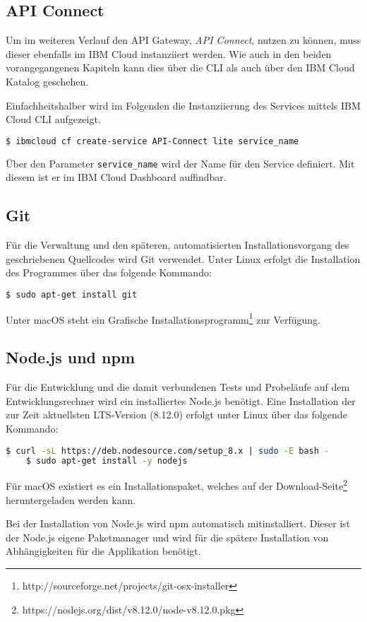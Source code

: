 \subsection{API Connect}
\label{subsec:apiconnect}
Um im weiteren Verlauf den API Gateway, \textit{API Connect}, nutzen zu können, muss dieser ebenfalls im IBM Cloud
instanziiert werden. Wie auch in den beiden vorangegangenen Kapiteln kann dies über die CLI als auch über den IBM Cloud
Katalog geschehen.

Einfachheitshalber wird im Folgenden die Instanziierung des Services mittels IBM Cloud CLI aufgezeigt.

\begin{lstlisting}[language=bash, caption=Instanziierung von API Connect, label=Instanziierung von API Connect]
$ ibmcloud cf create-service API-Connect lite service_name
\end{lstlisting}

Über den Parameter \texttt{service\_name} wird der Name für den Service definiert. Mit diesem ist er im IBM Cloud
Dashboard auffindbar.

\subsection{Git}
Für die Verwaltung und den späteren, automatisierten Installationsvorgang des geschriebenen Quellcodes wird Git verwendet.
Unter Linux erfolgt die Installation des Programmes über das folgende Kommando:

\begin{lstlisting}[language=bash, caption=Installation von Git, label=Installation von Git]
    $ sudo apt-get install git
\end{lstlisting}

Unter macOS steht ein Grafische Installationsprogramm\footnote{http://sourceforge.net/projects/git-osx-installer} zur
Verfügung.

\subsection{Node.js und npm}
Für die Entwicklung und die damit verbundenen Tests und Probeläufe auf dem Entwicklungsrechner wird ein installiertes
Node.js benötigt. Eine Installation der zur Zeit aktuellsten LTS-Version (8.12.0) erfolgt unter Linux über das folgende
Kommando:

\begin{lstlisting}[language=bash, caption=Installation von Node.js, label=Installation von Node.js]
    $ curl -sL https://deb.nodesource.com/setup_8.x | sudo -E bash -
    $ sudo apt-get install -y nodejs
\end{lstlisting}

Für macOS existiert es ein Installationspaket, welches auf der Download-Seite\footnote{https://nodejs.org/dist/v8.12.0/node-v8.12.0.pkg}
heruntergeladen werden kann.

Bei der Installation von Node.js wird npm automatisch mitinstalliert. Dieser ist der Node.js eigene Paketmanager und wird
für die spätere Installation von Abhängigkeiten für die Applikation benötigt.
